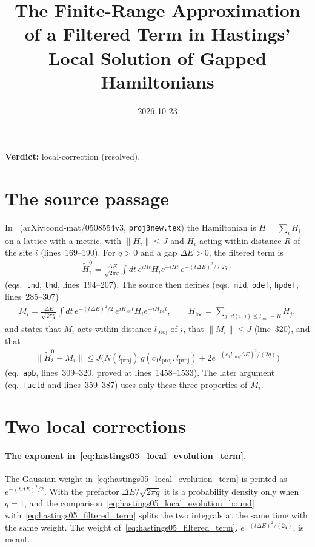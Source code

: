 \documentclass{article}
\title{The Finite-Range Approximation of a Filtered Term in Hastings' Local
  Solution of Gapped Hamiltonians}
\author{}
\date{2026-10-23}
\providecommand{\gapnote}[2]{\par\noindent\textbf{Verdict:} #1 (#2).\par}
\begin{document}
\maketitle
\gapnote{local-correction}{resolved}

\section{The source passage}

In~\cite{Hastings2006Solving} (arXiv:cond-mat/0508554v3, \texttt{proj3new.tex})
the Hamiltonian is $H=\sum_iH_i$ on a lattice with a metric, with
$\lVert H_i\rVert\le J$ and $H_i$ acting within distance $R$ of the site $i$
(lines~169--190). For $q>0$ and a gap $\Delta E>0$, the filtered term is
\begin{align}
  \tilde H_i^0=\frac{\Delta E}{\sqrt{2\pi q}}\int dt\,
  e^{iHt}H_ie^{-iHt}\,e^{-(t\Delta E)^2/(2q)}
  \label{eq:hastings05_filtered_term}
\end{align}
(eqs.~\texttt{tnd}, \texttt{thd}, lines~194--207). The source then defines
(eqs.~\texttt{mid}, \texttt{odef}, \texttt{hpdef}, lines~285--307)
\begin{align}
  M_i=\frac{\Delta E}{\sqrt{2\pi q}}\int dt\,
  e^{-(t\Delta E)^2/2}\,e^{iH_{\mathrm{loc}}t}H_ie^{-iH_{\mathrm{loc}}t},
  \qquad
  H_{\mathrm{loc}}=\sum_{j:\,d(i,j)\le l_{\mathrm{proj}}-R}H_j,
  \label{eq:hastings05_local_evolution_term}
\end{align}
and states that $M_i$ acts within distance $l_{\mathrm{proj}}$ of $i$, that
$\lVert M_i\rVert\le J$ (line~320), and that
\begin{align}
  \lVert\tilde H_i^0-M_i\rVert\le
  J\bigl(N(l_{\mathrm{proj}})\,g(c_1l_{\mathrm{proj}},l_{\mathrm{proj}})
  +2e^{-(c_1l_{\mathrm{proj}}\Delta E)^2/(2q)}\bigr)
  \label{eq:hastings05_local_evolution_bound}
\end{align}
(eq.~\texttt{apb}, lines~309--320, proved at lines~1458--1533). The later
argument (eq.~\texttt{facld} and lines~359--387) uses only these three
properties of $M_i$.

\section{Two local corrections}

\paragraph{The exponent in~\eqref{eq:hastings05_local_evolution_term}.}
The Gaussian weight in~\eqref{eq:hastings05_local_evolution_term} is printed as $e^{-(t\Delta E)^2/2}$. With the prefactor
$\Delta E/\sqrt{2\pi q}$ it is a probability density only when $q=1$, and the
comparison~\eqref{eq:hastings05_local_evolution_bound}
with~\eqref{eq:hastings05_filtered_term} splits the two integrals at the same
time with the same weight. The weight of~\eqref{eq:hastings05_filtered_term},
$e^{-(t\Delta E)^2/(2q)}$, is meant.
\end{document}
